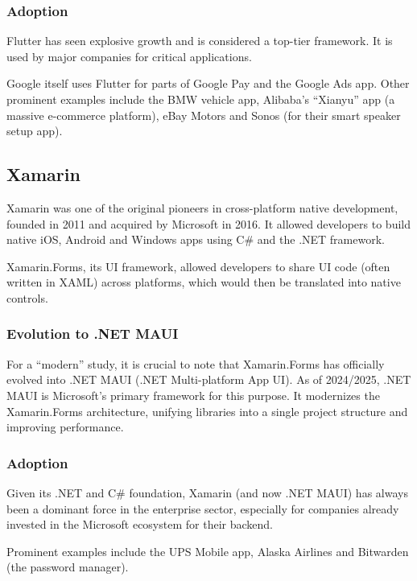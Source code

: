         \subsubsection{Adoption}
        Flutter has seen explosive growth and is considered a top-tier framework. It is used by major companies for critical applications.
        
        Google itself uses Flutter for parts of Google Pay and the Google Ads app. Other prominent examples include the BMW vehicle app, Alibaba's ``Xianyu'' app (a massive e-commerce platform), eBay Motors and Sonos (for their smart speaker setup app). \cite{Flutter:02}

    \subsection{Xamarin}
        Xamarin was one of the original pioneers in cross-platform native development, founded in 2011 and acquired by Microsoft in 2016. It allowed developers to build native iOS, Android and Windows apps using C\# and the .NET framework.
        
        Xamarin.Forms, its UI framework, allowed developers to share UI code (often written in XAML) across platforms, which would then be translated into native controls. \cite{Xamarin:01}
        
        \subsubsection{Evolution to .NET MAUI}
        For a ``modern'' study, it is crucial to note that Xamarin.Forms has officially evolved into .NET MAUI (.NET Multi-platform App UI). As of 2024/2025, .NET MAUI is Microsoft's primary framework for this purpose. It modernizes the Xamarin.Forms architecture, unifying libraries into a single project structure and improving performance. \cite{Xamarin:00}
        
        \subsubsection{Adoption}
        Given its .NET and C\# foundation, Xamarin (and now .NET MAUI) has always been a dominant force in the enterprise sector, especially for companies already invested in the Microsoft ecosystem for their backend. 
        
        Prominent examples include the UPS Mobile app, Alaska Airlines and Bitwarden (the password manager). \cite{Xamarin:02}

